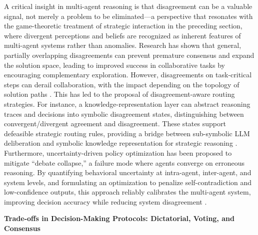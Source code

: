 \documentclass[11pt]{article}
\begin{document}
A critical insight in multi-agent reasoning is that disagreement can be a valuable signal, not merely a problem to be eliminated---a perspective that resonates with the game-theoretic treatment of strategic interaction in the preceding section, where divergent perceptions and beliefs are recognized as inherent features of multi-agent systems rather than anomalies. Research has shown that general, partially overlapping disagreements can prevent premature consensus and expand the solution space, leading to improved success in collaborative tasks by encouraging complementary exploration. However, disagreements on task-critical steps can derail collaboration, with the impact depending on the topology of solution paths \cite{ref206}. This has led to the proposal of disagreement-aware routing strategies. For instance, a knowledge-representation layer can abstract reasoning traces and decisions into symbolic disagreement states, distinguishing between convergent/divergent agreement and disagreement. These states support defeasible strategic routing rules, providing a bridge between sub-symbolic LLM deliberation and symbolic knowledge representation for strategic reasoning \cite{ref83}. Furthermore, uncertainty-driven policy optimization has been proposed to mitigate ``debate collapse,'' a failure mode where agents converge on erroneous reasoning. By quantifying behavioral uncertainty at intra-agent, inter-agent, and system levels, and formulating an optimization to penalize self-contradiction and low-confidence outputs, this approach reliably calibrates the multi-agent system, improving decision accuracy while reducing system disagreement \cite{ref207}.

\textbf{Trade-offs in Decision-Making Protocols: Dictatorial, Voting, and Consensus}
\end{document}
